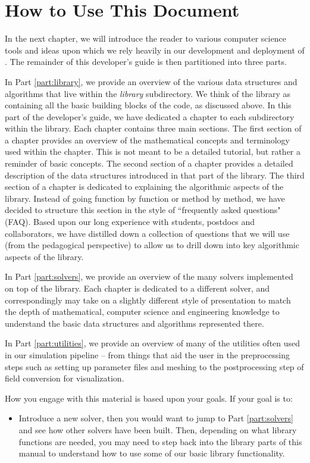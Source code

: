 \section{How to Use This Document}

In the next chapter, we will introduce the reader to various computer science tools and ideas upon which we rely heavily in our development and deployment of {\nek}.  The remainder of this developer's guide is then partitioned into three parts.

In Part \ref{part:library}, we provide an overview of the various data structures and algorithms that live within the {\em library} subdirectory.  We think of the library as containing all the basic building blocks of the {\nek} code, as discussed above.  In this part of the developer's guide, we have dedicated a chapter to each subdirectory within the library.  Each chapter contains three main sections.  The first section of a chapter provides an overview of the mathematical concepts and terminology used within the chapter.  This is not meant to be a detailed tutorial, but rather a reminder of basic concepts.  The second section of a chapter provides a detailed description of the data structures introduced in that part of the library.  The third section of a chapter is dedicated to explaining the algorithmic aspects of the library.  Instead of going function by function or method by method, we have decided to structure this section in the style of ``frequently asked questions" (FAQ).  Based upon our long experience with students, postdocs and collaborators, we have distilled down a collection of questions that we will use (from the pedagogical perspective) to allow us to drill down into key algorithmic aspects of the library.

In Part \ref{part:solvers}, we provide an overview of the many solvers implemented on top of the {\nek} library.  Each chapter is dedicated to a different solver, and correspondingly may take on a slightly different style of presentation to match the depth of mathematical, computer science and engineering knowledge to understand the basic data structures and algorithms represented there.

In Part \ref{part:utilities}, we provide an overview of many of the utilities often used in our simulation pipeline -- from things that aid the user in the preprocessing steps such as setting up parameter files and meshing to the postprocessing step of field conversion for visualization.

How you engage with this material is based upon your goals.  If your goal is to:

\begin{itemize}
\item Introduce a new solver, then you would want to jump to Part \ref{part:solvers} and see how other solvers have been built.  Then, depending on what library functions are needed, you may need to step back into the library parts of this manual to understand how to use some of our basic library functionality.
\end{itemize} 







